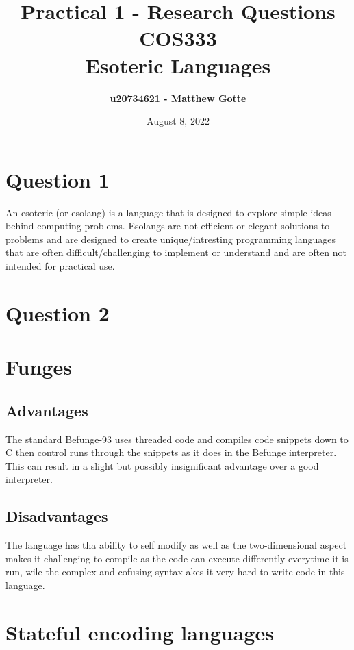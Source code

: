 \documentclass{article}
\title{
    Practical 1 - Research Questions \\
    COS333 \\
    Esoteric Languages
}
\author{
    \textbf{u20734621 - Matthew Gotte}   
}
\date{August 8, 2022}
\begin{document}
    \maketitle

\section*{Question 1}

    An esoteric (or esolang) is a language that is designed to explore simple ideas behind computing problems. Esolangs are not
    efficient or elegant solutions to problems and are designed to create unique/intresting programming languages that are often difficult/challenging to implement or understand
    and are often not intended for practical use. \cite{EsotericProgrammingLanguagesDefinition}

\section*{Question 2}

    \section{Funges}

        \subsection{Advantages}
        The standard Befunge-93 uses threaded code and compiles code snippets down to C then control runs through the snippets as it does in the Befunge interpreter.
        This can result in a slight but possibly insignificant advantage over a good interpreter. \cite{wiki:befunge}

        \subsection{Disadvantages}
        The language has tha ability to self modify as well as the two-dimensional aspect makes it challenging to compile as the code can execute
        differently everytime it is run, wile the complex and cofusing syntax akes it very hard to write code in this language. \cite{befunge}


    \section{Stateful encoding languages}
\end{document}
